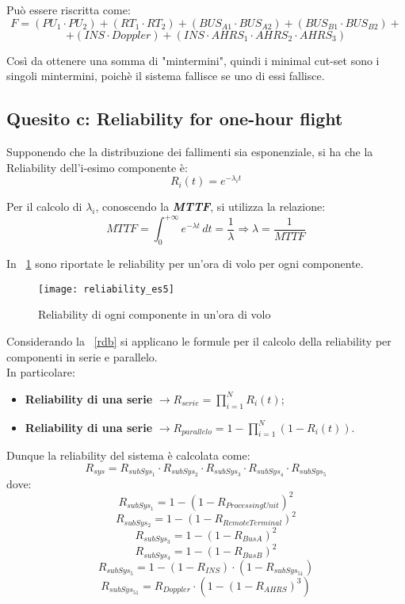 Può essere riscritta come:
$$ F = (PU_1 \cdot PU_2) + (RT_1 \cdot RT_2) + (BUS_{A1} \cdot BUS_{A2}) + (BUS_{B1} \cdot BUS_{B2})+$$
$$+ (INS \cdot Doppler) + (INS \cdot AHRS_1 \cdot AHRS_2 \cdot AHRS_3)$$

Così da ottenere una somma di "mintermini", quindi i minimal cut-set sono i singoli
mintermini, poichè il sistema fallisce se uno di essi fallisce.\\

\clearpage

\subsection{Quesito c: Reliability for one-hour flight}

Supponendo che la distribuzione dei fallimenti sia esponenziale, si ha che la
Reliability dell'i-esimo componente è:
$$R_i(t) = e^{-\lambda_i t}$$

Per il calcolo di $\lambda_i$, conoscendo la \textbf{\textit{MTTF}}, si utilizza
la relazione:
$$ MTTF = \int_{0}^{+\infty} e^{-\lambda t}\, dt = \frac{1}{\lambda}  \Longrightarrow \lambda = \frac{1}{MTTF} $$

In \figurename~\ref{reliability_es5} sono riportate le reliability per un'ora di
volo per ogni componente.\\

\begin{figure}[!htbp]
  \centering
  \texttt{[image: reliability\_es5]}
  \caption{Reliability di ogni componente in un'ora di volo}
  \label{reliability_es5}
\end{figure}

Considerando la \figurename~\ref{rdb} si applicano le formule per il calcolo
della reliability per componenti in serie e parallelo.\\
In particolare:
\begin{itemize}
  \item \textbf{Reliability di una serie} $\rightarrow R_{serie} = \prod_{i=1}^{N}{R_i(t)}$;
  \item \textbf{Reliability di una serie} $\rightarrow R_{parallelo} = 1 - \prod_{i=1}^{N}{(1- R_i(t))}$.
\end{itemize}

Dunque la reliability del sistema è calcolata come:
$$ R_{sys} = R_{subSys_1} \cdot R_{subSys_2} \cdot R_{subSys_3} \cdot R_{subSys_4} \cdot R_{subSys_5}$$
dove:
$$R_{subSys_1} = 1 - (1 - R_{ProcessingUnit})^2$$
$$R_{subSys_2} = 1 - (1 - R_{RemoteTerminal})^2$$
$$R_{subSys_3} = 1 - (1 - R_{BusA})^2$$
$$R_{subSys_4} = 1 - (1 - R_{BusB})^2$$
$$R_{subSys_5} = 1 - (1 - R_{INS}) \cdot (1 - R_{subSys_51})$$
$$R_{subSys_51} = R_{Doppler} \cdot (1 - (1 - R_{AHRS})^3)$$

